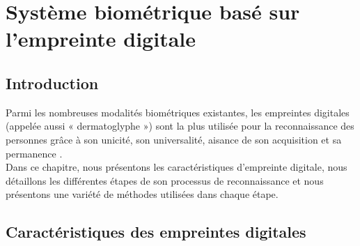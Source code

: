 \chapter{Système biométrique basé sur l'empreinte digitale}
\label{Chapter2} %

\section{Introduction}
Parmi les nombreuses modalités biométriques existantes, les empreintes digitales (appelée aussi « dermatoglyphe ») sont la plus utilisée pour la reconnaissance des personnes grâce à son unicité, son universalité, aisance de son acquisition et sa permanence \citep{maltoni2009handbook}.\\
Dans ce chapitre, nous présentons les caractéristiques d'empreinte digitale, nous détaillons les différentes étapes de son processus de reconnaissance et nous présentons une variété de méthodes utilisées dans chaque étape.
\section{Caractéristiques des empreintes digitales}

